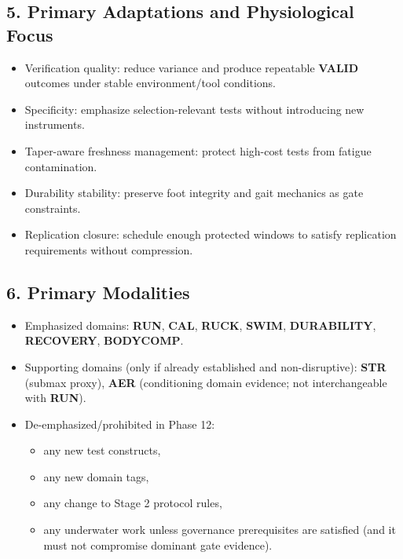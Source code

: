 \documentclass[10pt]{article}
\begin{document}
\subsection*{5. Primary Adaptations and Physiological Focus}


\begin{itemize}
\item Verification quality: reduce variance and produce repeatable \textbf{VALID} outcomes under stable environment/tool conditions.
\item Specificity: emphasize selection-relevant tests without introducing new instruments.
\item Taper-aware freshness management: protect high-cost tests from fatigue contamination.
\item Durability stability: preserve foot integrity and gait mechanics as gate constraints.
\item Replication closure: schedule enough protected windows to satisfy replication requirements without compression.
\end{itemize}

\subsection*{6. Primary Modalities}


\begin{itemize}
\item Emphasized domains: \textbf{RUN}, \textbf{CAL}, \textbf{RUCK}, \textbf{SWIM}, \textbf{DURABILITY}, \textbf{RECOVERY}, \textbf{BODYCOMP}.
\item Supporting domains (only if already established and non-disruptive): \textbf{STR} (submax proxy), \textbf{AER} (conditioning domain evidence; not interchangeable with \textbf{RUN}).
\item De-emphasized/prohibited in Phase 12:
  \begin{itemize}
  \item any new test constructs,
  \item any new domain tags,
  \item any change to Stage 2 protocol rules,
  \item any underwater work unless governance prerequisites are satisfied (and it must not compromise dominant gate evidence).
  \end{itemize}
\end{itemize}
\end{document}
